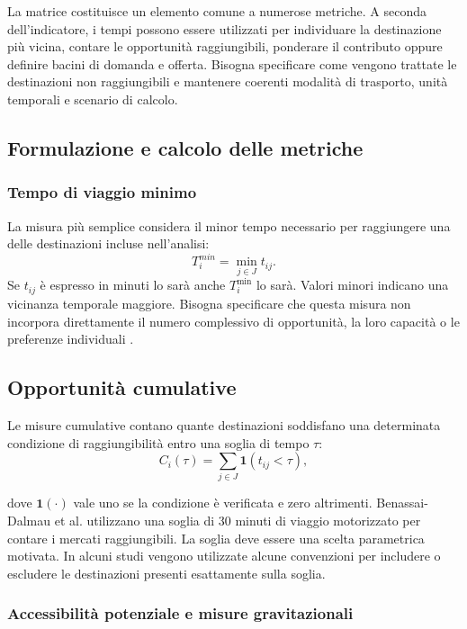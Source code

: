 La matrice costituisce un elemento comune a numerose metriche. A seconda dell'indicatore, i tempi possono essere utilizzati per individuare la destinazione più vicina, contare le opportunità raggiungibili, ponderare il contributo oppure definire bacini di domanda e offerta.
Bisogna specificare come vengono trattate le destinazioni non raggiungibili e mantenere coerenti modalità di trasporto, unità temporali e scenario di calcolo.

\subsection{Formulazione e calcolo delle metriche}

\subsubsection{Tempo di viaggio minimo}

La misura più semplice considera il minor tempo necessario per raggiungere una delle destinazioni incluse nell'analisi:
\begin{equation}
    T_i^{min} = \min_{j\in J}t_{ij}.
\end{equation}
Se $t_{ij}$ è espresso in minuti lo sarà anche $T_i^{\min}$ lo sarà. Valori minori indicano una vicinanza temporale maggiore. Bisogna specificare che questa misura non incorpora direttamente il numero complessivo di opportunità, la loro capacità o le preferenze individuali \cite{wu2025,benassai2026}.


\subsection{Opportunità cumulative}
Le misure cumulative contano quante destinazioni soddisfano una determinata condizione di raggiungibilità entro una soglia di tempo $\tau$:
\begin{equation}
    C_i(\tau) =\sum_{j\in J}\mathbf{1}(t_{ij}<\tau),
\end{equation}

dove $\mathbf{1}(\cdot)$ vale uno se la condizione è verificata e zero altrimenti. Benassai-Dalmau et al. utilizzano una soglia di 30 minuti di viaggio motorizzato per contare i mercati raggiungibili.
La soglia deve essere una scelta parametrica motivata. In alcuni studi  vengono utilizzate alcune convenzioni per includere o escludere le destinazioni presenti esattamente sulla soglia\cite{benassai2026}.

\subsubsection{Accessibilità potenziale e misure gravitazionali}

